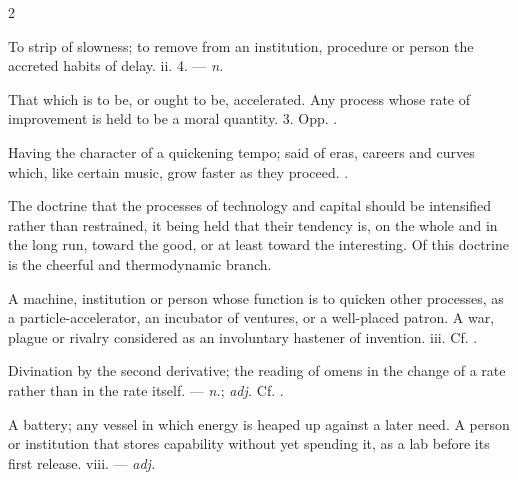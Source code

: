 \begin{multicols}{2}

 To strip of slowness; to remove from an institution, procedure or person the accreted habits of delay.   ii. 4. —  \textit{n.}

  That which is to be, or ought to be, accelerated.   Any process whose rate of improvement is held to be a moral quantity.   3. Opp. .

 Having the character of a quickening tempo; said of eras, careers and curves which, like certain music, grow faster as they proceed. .

 The doctrine that the processes of technology and capital should be intensified rather than restrained, it being held that their tendency is, on the whole and in the long run, toward the good, or at least toward the interesting. Of this doctrine  is the cheerful and thermodynamic branch.

  A machine, institution or person whose function is to quicken other processes, as a particle-accelerator, an incubator of ventures, or a well-placed patron.   A war, plague or rivalry considered as an involuntary hastener of invention.   iii. Cf. .

 Divination by the second derivative; the reading of omens in the change of a rate rather than in the rate itself.  —  \textit{n.};  \textit{adj.} Cf. .

  A battery; any vessel in which energy is heaped up against a later need.   A person or institution that stores capability without yet spending it, as a lab before its first release.   viii. —  \textit{adj.}


\end{multicols}
